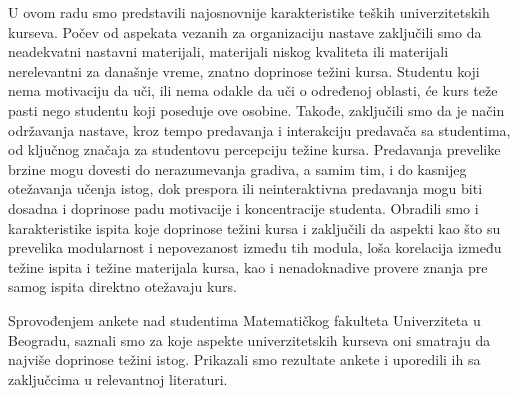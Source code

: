 \documentclass[a4paper]{article}
\begin{document}
U ovom radu smo predstavili najosnovnije karakteristike teških univerzitetskih kurseva. Počev od aspekata vezanih za organizaciju nastave zaključili smo da neadekvatni nastavni materijali, materijali niskog kvaliteta ili materijali nerelevantni za današnje vreme, znatno doprinose težini kursa. Studentu koji nema motivaciju da uči, ili nema odakle da uči o određenoj oblasti, će kurs teže pasti nego studentu koji poseduje ove osobine. Takođe, zaključili smo da je način održavanja nastave, kroz tempo predavanja i interakciju predavača sa studentima, od ključnog značaja za studentovu percepciju težine kursa. Predavanja prevelike brzine mogu dovesti do nerazumevanja gradiva, a samim tim, i do kasnijeg otežavanja učenja istog, dok prespora ili neinteraktivna predavanja mogu biti dosadna i doprinose padu motivacije i koncentracije studenta. Obradili smo i karakteristike ispita koje doprinose težini kursa i zaključili da aspekti kao što su prevelika modularnost i nepovezanost između tih modula, loša korelacija između težine ispita i težine materijala kursa, kao i nenadoknadive provere znanja pre samog ispita direktno otežavaju kurs.

Sprovođenjem ankete nad studentima Matematičkog fakulteta Univerziteta u Beogradu, saznali smo za koje aspekte univerzitetskih kurseva oni smatraju da najviše doprinose težini istog. Prikazali smo rezultate ankete i uporedili ih sa zaključcima u relevantnoj literaturi.

\newpage

\appendix
 

\end{document}
